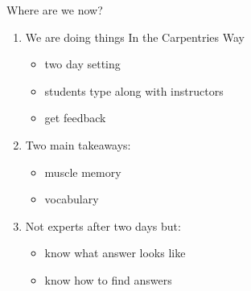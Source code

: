 \begin{frame} {Where are we now?}
	\begin{enumerate}
		\item We are doing things In the Carpentries Way
		\begin{itemize}
			\item two day setting
			\item students type along with instructors
			\item get feedback
		\end{itemize}
		\item Two main takeaways:
			\begin{itemize}
				\item muscle memory 
				\item vocabulary
			\end{itemize}
		\item Not experts after two days but:
			\begin{itemize}
				\item know what answer looks like
				\item know how to find answers
			\end{itemize} 
	\end{enumerate}
	
	\note[item]{}
\end{frame}